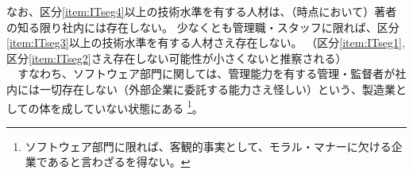 \begin{hosoku}
なお、区分\ref{item:ITseg4}\hx 以上の技術水準を有する人材は、（\dateTechnicalLevel 時点において）著者の知る限り社内には存在しない。
少なくとも管理職・スタッフに限れば、区分\ref{item:ITseg3}\hx 以上の技術水準を有する人材さえ存在しない。
（区分\ref{item:ITseg1}, 区分\ref{item:ITseg2}\hx さえ存在しない可能性が小さくないと推察される）\\
　すなわち、ソフトウェア部門に関しては、管理能力を有する管理・監督者が社内には一切存在しない（外部企業に委託する能力さえ怪しい）という、製造業としての体を成していない状態にある
\footnote{ソフトウェア部門に限れば、客観的事実として、モラル・マナーに欠ける企業であると言わざるを得ない。}。
\end{hosoku}
